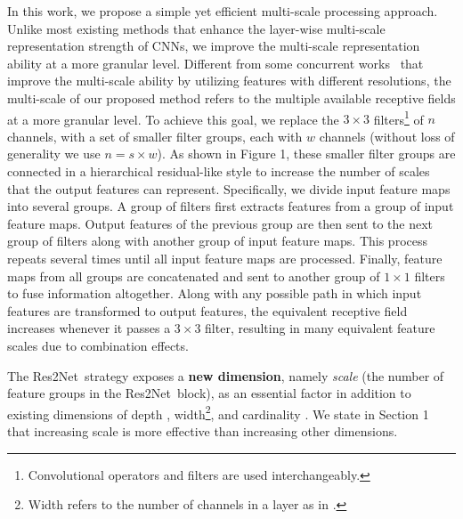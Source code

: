 \documentclass[10pt,journal,cspaper,compsoc]{IEEEtran}
\newcommand{\CheckRmv}[1]{}
\newcommand{\figref}[1]{Figure 1}%
\newcommand{\secref}[1]{Section 1}
\newcommand{\CheckRmv}[1]{#1}
\newcommand{\figref}[1]{Fig.~\ref{#1}}%
\newcommand{\secref}[1]{Sec.~\ref{#1}}
\newcommand{\ourM}{{Res2Net}}
\begin{document}
\CheckRmv{
\begin{figure}[t]
  \centering
  \begin{overpic}[width=\linewidth]{figures/structure.pdf}
     \put(7.5,2.5){(a) Bottleneck block}
     \put(57,2.5){(b) \ourM~module}
  \end{overpic}
  \caption{Comparison between the bottleneck block and the proposed
  	\ourM~module (the scale dimension $s=4$).
  }\label{fig:structure}
\end{figure}
}

In this work, we propose a simple yet efficient multi-scale processing approach.
%
Unlike most existing methods that enhance the
layer-wise multi-scale representation strength of CNNs,
we improve the multi-scale representation ability at a more granular level.
%
Different from some concurrent works~\cite{chen2019drop,chen2018biglittle,cheng2019high} 
that improve the multi-scale ability
by utilizing features with different resolutions,
 the multi-scale of our proposed method refers to 
the multiple available receptive fields at a more granular level.
%
To achieve this goal, we replace the $3 \times 3$ filters\footnote{
Convolutional operators and filters are used interchangeably.}
of $n$ channels, with a set of smaller filter groups, each with $w$ channels
(without loss of generality we use $n = s \times w$).
% 
As shown in \figref{fig:structure},
these smaller filter groups are connected in a hierarchical residual-like style
to increase the number of scales that the output features can represent.
%
Specifically, we divide input feature maps into several groups.
%
A group of filters first extracts features from a group of input feature maps.
%
Output features of the previous group are then sent to
the next group of filters along with another group of input feature maps.
%
This process repeats several times until all input feature maps are processed.
%
Finally, feature maps from all groups are concatenated
and sent to another group of $1 \times 1$ filters to fuse information
altogether.
%
Along with any possible path in which input features are transformed to output features,
the equivalent receptive field increases whenever it passes 
a $3 \times 3$ filter,
resulting in many equivalent feature scales due to combination effects.


The \ourM~strategy exposes a \textbf{new dimension}, namely
\emph{scale} (the number of feature groups in the \ourM~block),
as an essential factor in addition to existing dimensions of
depth \cite{simonyan2014very}, width\footnote{
Width refers to the number of channels in a layer as in
\cite{Zagoruyko2016WRN}.},
and cardinality \cite{xie2017aggregated}.
%
We state in \secref{sec:compare_dimentions} that increasing
scale is more effective than increasing other dimensions.
\end{document}
